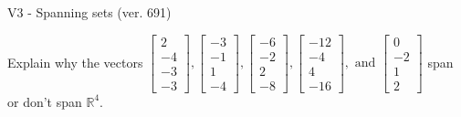 \begin{exercise}
  \begin{exerciseTitle}V3 - Spanning sets (ver. 691)\end{exerciseTitle}
  \begin{exerciseStatement}
    Explain why the vectors \(\left[\begin{array}{r}
2 \\
-4 \\
-3 \\
-3
\end{array}\right] , \left[\begin{array}{r}
-3 \\
-1 \\
1 \\
-4
\end{array}\right] , \left[\begin{array}{r}
-6 \\
-2 \\
2 \\
-8
\end{array}\right] , \left[\begin{array}{r}
-12 \\
-4 \\
4 \\
-16
\end{array}\right] , \text{ and } \left[\begin{array}{r}
0 \\
-2 \\
1 \\
2
\end{array}\right]\) span or don't span \(\mathbb{R}^4\). 
	



\end{exerciseStatement}
\end{exercise}
